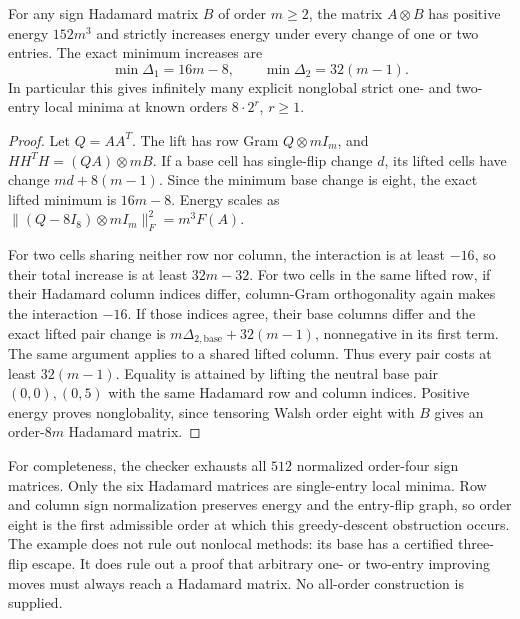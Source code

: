 \begin{theorem}
\label{thm:spectral-tensor-discrete-traps}
For any sign Hadamard matrix $B$ of order $m\ge2$, the matrix
$A\otimes B$ has positive energy $152m^3$ and strictly increases energy
under every change of one or two entries. The exact minimum increases are
\[
 \min\Delta_1=16m-8,\qquad \min\Delta_2=32(m-1).
\]
In particular this gives infinitely many explicit nonglobal strict
one- and two-entry local minima at known orders $8\cdot2^r$, $r\ge1$.
\end{theorem}
\begin{proof}
Let $Q=AA^T$. The lift has row Gram $Q\otimes mI_m$, and
$HH^TH=(Q A)\otimes mB$. If a base cell has single-flip change $d$,
its lifted cells have change $md+8(m-1)$. Since the minimum base change
is eight, the exact lifted minimum is $16m-8$.
Energy scales as
$\|(Q-8I_8)\otimes mI_m\|_F^2=m^3F(A)$.

For two cells sharing neither row nor column, the interaction is at
least $-16$, so their total increase is at least $32m-32$.
For two cells in the same lifted row, if their Hadamard column indices
differ, column-Gram orthogonality again makes the interaction $-16$.
If those indices agree, their base columns differ and the exact lifted
pair change is $m\Delta_{2,\mathrm{base}}+32(m-1)$, nonnegative in its
first term. The same argument applies to a shared lifted column.
Thus every pair costs at least $32(m-1)$. Equality is attained by lifting
the neutral base pair $(0,0),(0,5)$ with the same Hadamard row and column
indices. Positive energy proves nonglobality, since tensoring Walsh order eight with $B$ gives an order-$8m$
Hadamard matrix.
\end{proof}

For completeness, the checker exhausts all $512$ normalized order-four
sign matrices. Only the six Hadamard matrices are single-entry local
minima. Row and column sign normalization preserves energy and the
entry-flip graph, so order eight is the first admissible order at which
this greedy-descent obstruction occurs. The example does not rule out
nonlocal methods: its base has a certified three-flip escape. It does
rule out a proof that arbitrary one- or two-entry improving moves must
always reach a Hadamard matrix. No all-order construction is supplied.

